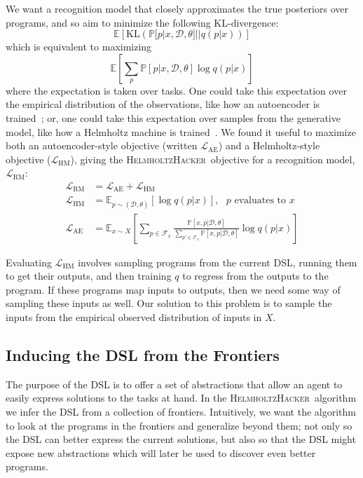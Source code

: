 \documentclass{article}
\newcommand{\system}{\textsc{HelmholtzHacker}~}
\newcommand{\expect}{\mathds{E}} %
\newcommand{\probability}{\mathds{P}} %
\begin{document}
We want a recognition model that closely approximates the true posteriors over programs, and so aim to minimize the following KL-divergence:
\begin{equation*}
  \expect\left[\text{KL}\left(\probability[p|x,\mathcal{D},\theta]||q(p|x) \right) \right]
\end{equation*}
which is equivalent to maximizing
$$
  \expect\left[\sum_p\probability[p|x,\mathcal{D},\theta]\log q(p|x) \right]
$$
  where the expectation is taken over tasks. One could take this expectation
  over the empirical distribution of the observations,
  like how an autoencoder is trained~\cite{hinton2006reducing}; or, one could take this expectation over samples from the generative model, like how a Helmholtz machine is trained~\cite{dayan1995helmholtz}.
  We found it useful to maximize both an autoencoder-style objective (written $\mathcal{L}_{\text{AE}}$) and a Helmholtz-style objective ($\mathcal{L}_{\text{HM}}$), giving the \system objective for a recognition model, $\mathcal{L}_{\text{RM}}$:
  \begin{align}
  \mathcal{L}_{\text{RM}}& = \mathcal{L}_\text{AE} + \mathcal{L}_\text{HM}\\
  \mathcal{L}_{\text{HM}}& = \expect_{p\sim(\mathcal{D},\theta) }\left[\log q(p|x)\right],\text{ $p$ evaluates to $x$}\nonumber\\
  \mathcal{L}_{\text{AE}}& = \expect_{x\sim X}\left[\sum_{p\in \mathcal{F}_x}
    \frac{\probability\left[x,p|\mathcal{D},\theta \right]}{\sum_{p'\in \mathcal{F}_x}\probability\left[x,p|\mathcal{D},\theta \right]}\log q(p|x)\right]\nonumber
  \end{align}

  Evaluating $\mathcal{L}_{\text{HM}}$ involves sampling programs from
  the current DSL, running them to get their outputs,
  and then training $q$ to regress from the outputs to the program.
  If these programs map inputs to outputs,
  then we need some way of sampling these inputs as well.
  Our solution to this problem is to sample the inputs
  from the empirical observed distribution of inputs in $X$.

\subsection{Inducing the DSL from the Frontiers}\label{grammarInductionSection}

The purpose of the DSL is to
offer a set of abstractions
that allow an agent to easily express solutions to the tasks at hand.
In the \system algorithm we infer the DSL from a collection of frontiers.
Intuitively, we want the algorithm to
look at the programs in the frontiers and
generalize beyond them; 
not only so the DSL can better express the current solutions,
but also so that the DSL might expose new abstractions
which will later be used to
discover even better programs.
\end{document}
